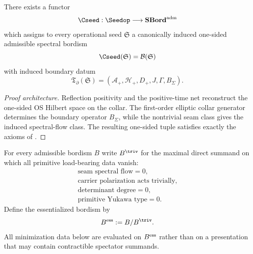 \begin{theorem}
\label{thm:operational-collar-completion}
There exists a functor
\[
\Cseed:\Seedop\longrightarrow \mathbf{SBord}^{\mathrm{adm}}
\]
which assigns to every operational seed $\mathfrak S$ a canonically induced one-sided admissible
spectral bordism
\[
\Cseed(\mathfrak S)=\mathcal B(\mathfrak S)
\]
with induced boundary datum
\[
\mathfrak T_{\partial}(\mathfrak S)=(\mathcal A_+,\mathcal H_+,D_+,J,\Gamma,B_\Sigma).
\]
\end{theorem}

\begin{proof}[Proof architecture]
Reflection positivity and the positive-time net reconstruct the one-sided OS Hilbert space on the
collar. The first-order elliptic collar generator determines the boundary operator $B_\Sigma$,
while the nontrivial seam class gives the induced spectral-flow class. The resulting one-sided
tuple satisfies exactly the axioms of .
\end{proof}

\begin{definition}
For every admissible bordism $B$ write $B^{\triv}$ for the maximal direct summand on which all
primitive load-bearing data vanish:
\begin{equation}
\boxed{
\begin{gathered}
\text{seam spectral flow}=0,\\
\text{carrier polarization acts trivially},\\
\text{determinant degree}=0,\\
\text{primitive Yukawa type}=0.
\end{gathered}}
\end{equation}
Define the essentialized bordism by
\begin{equation}
B^{\textup{ess}}:=B/B^{\triv}.
\end{equation}
All minimization data below are evaluated on $B^{\textup{ess}}$ rather than on a presentation that
may contain contractible spectator summands.
\end{definition}

